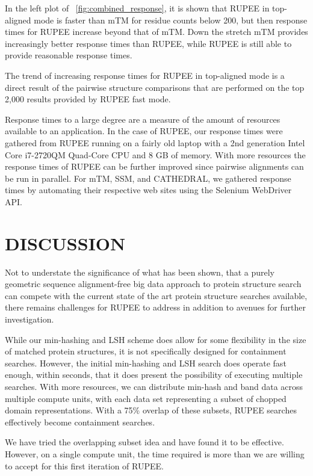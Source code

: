 \documentclass[a4,center,fleqn]{NAR}
\begin{document}
In the left plot of \figurename~\ref{fig:combined_response}, it is shown that RUPEE in top-aligned mode is faster than mTM for residue counts below 200, but then response times for RUPEE increase beyond that of mTM. 
Down the stretch mTM provides increasingly better response times than RUPEE, while RUPEE is still able to provide reasonable response times. 

The trend of increasing response times for RUPEE in top-aligned mode is a direct result of the pairwise structure comparisons that are performed on the top 2,000 results provided by RUPEE fast mode.

Response times to a large degree are a measure of the amount of resources available to an application. 
In the case of RUPEE, our response times were gathered from RUPEE running on a fairly old laptop with a 2nd generation Intel\textregistered{} Core\texttrademark{} i7-2720QM Quad-Core CPU and 8 GB of memory. 
With more resources the response times of RUPEE can be further improved since pairwise alignments can be run in parallel. 
For mTM, SSM, and CATHEDRAL, we gathered response times by automating their respective web sites using the Selenium WebDriver API. 

\section{DISCUSSION}

Not to understate the significance of what has been shown, that a purely geometric sequence alignment-free big data approach to protein structure search can compete with the current state of the art protein structure searches available, there remains challenges for RUPEE to address in addition to avenues for further investigation. 

While our min-hashing and LSH scheme does allow for some flexibility in the size of matched protein structures, it is not specifically designed for containment searches. 
However, the initial min-hashing and LSH search does operate fast enough, within seconds, that it does present the possibility of executing multiple searches. 
With more resources, we can distribute min-hash and band data across multiple compute units, with each data set representing a subset of chopped domain representations. 
With a 75\% overlap of these subsets, RUPEE searches effectively become containment searches. 

We have tried the overlapping subset idea and have found it to be effective. 
However, on a single compute unit, the time required is more than we are willing to accept for this first iteration of RUPEE. 
\end{document}
